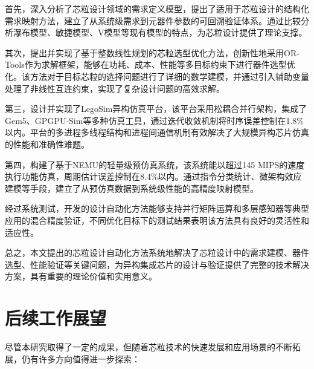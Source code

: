 \documentclass[bachelor]{thesis-uestc}
\begin{document}
首先，深入分析了芯粒设计领域的需求定义模型，提出了适用于芯粒设计的结构化需求映射方法，建立了从系统级需求到元器件参数的可回溯验证体系。通过比较分析瀑布模型、敏捷模型、V模型等现有模型的特点，为芯粒设计提供了理论支撑。

其次，提出并实现了基于整数线性规划的芯粒选型优化方法，创新性地采用OR-Tools作为求解框架，能够在功耗、成本、性能等多目标约束下进行器件选型优化。该方法对于目标芯粒的选择问题进行了详细的数学建模，并通过引入辅助变量处理了非线性互连约束，实现了复杂设计问题的高效求解。

第三，设计并实现了LegoSim异构仿真平台，该平台采用松耦合并行架构，集成了Gem5、GPGPU-Sim等多种仿真工具，通过迭代收敛机制将时序误差控制在1.8\%以内。平台的多进程多线程结构和进程间通信机制有效解决了大规模异构芯片仿真的性能和准确性难题。

第四，构建了基于NEMU的轻量级预仿真系统，该系统能以超过145 MIPS的速度执行功能仿真，周期估计误差控制在8.4\%以内。通过指令分类统计、微架构效应建模等手段，建立了从预仿真数据到系统级性能的高精度映射模型。

经过系统测试，开发的设计自动化方法能够支持并行矩阵运算和多层感知器等典型应用的混合精度验证，不同优化目标下的测试结果表明该方法具有良好的灵活性和适应性。

总之，本文提出的芯粒设计自动化方法系统地解决了芯粒设计中的需求建模、器件选型、性能验证等关键问题，为异构集成芯片的设计与验证提供了完整的技术解决方案，具有重要的理论价值和实用意义。

\section{后续工作展望}

尽管本研究取得了一定的成果，但随着芯粒技术的快速发展和应用场景的不断拓展，仍有许多方向值得进一步探索：
\end{document}

